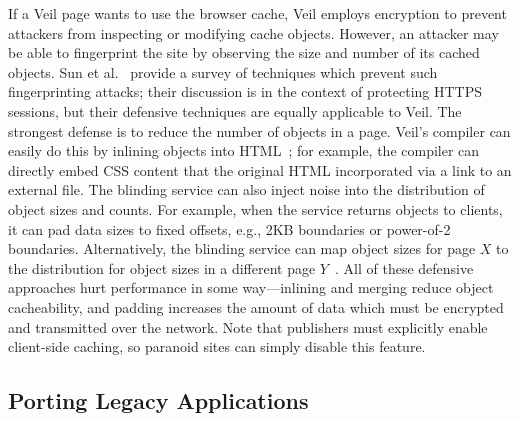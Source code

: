 If a Veil page wants to use the browser cache, Veil
employs encryption to prevent attackers from inspecting
or modifying cache objects. However, an attacker may
be able to fingerprint the site by observing the size
and number of its cached objects. Sun et al.~\cite{sun02} provide a
survey of techniques which prevent such fingerprinting attacks; 
their discussion is in the context of
protecting HTTPS sessions, but their defensive
techniques are equally applicable to Veil. The strongest
defense is to reduce the number of objects in a page.
Veil's compiler can easily do this by inlining objects
into HTML~\cite{silo}; for example, the compiler can
directly embed CSS content that the original HTML
incorporated via a link to an external file. The blinding
service can also inject noise into the distribution of object
sizes and counts. For example, when the service returns
objects to clients, it can pad data sizes to fixed offsets,
e.g., 2KB boundaries or power-of-2 boundaries. Alternatively,
the blinding service can map object sizes for page $X$ to
the distribution for object sizes in a different page
$Y$~\cite{wright09}. All of these defensive approaches
hurt performance in some way---inlining and merging
reduce object cacheability, and padding increases the
amount of data which must be encrypted and transmitted
over the network. Note that publishers must explicitly
enable client-side caching, so paranoid sites can simply
disable this feature.


\subsection{Porting Legacy Applications}
\label{sec:porting}

